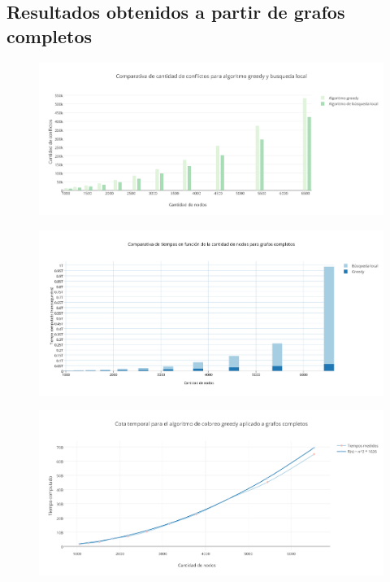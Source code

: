\subsection {Resultados obtenidos a partir de grafos completos} 


 \begin{figure}[H]
    \begin{center}
  	\includegraphics[width=18cm]{imagenes/Ej5/ComparacionConflictosCompleto.png}
 	\label{ComparacionConflictosCompleto}
    \end{center}
  \end{figure}

 \begin{figure}[H]
    \begin{center}
  	\includegraphics[width=18cm]{imagenes/Ej5/ComparacionTiemposCompleto.png}
 	\label{ComparacionTiemposCompleto}
    \end{center}
  \end{figure}

 \begin{figure}[H]
    \begin{center}
  	\includegraphics[width=18cm]{imagenes/Ej5/TiempoGreedyCompleto.png}
 	\label{TiempoGreedyCompleto}
    \end{center}
  \end{figure}

